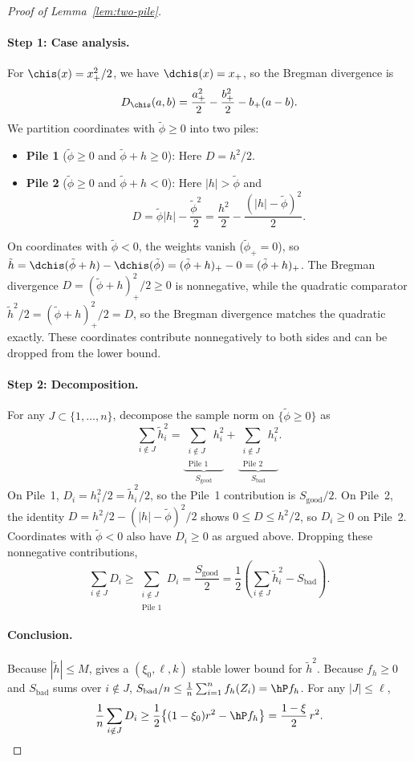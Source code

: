 \documentclass{article}
\begin{document}
\begin{proof}[Proof of Lemma~\ref{lem:two-pile}]
\paragraph{Step 1: Case analysis.}
For $\chis(x) = x_+^2/2$, we have $\dchis(x) = x_+$, so the Bregman divergence is
\[
D_{\chis}(a, b) = \frac{a_+^2}{2} - \frac{b_+^2}{2} - b_+(a - b).
\]
We partition coordinates with $\tilde\phi \ge 0$ into two piles:
\begin{itemize}
\item \textbf{Pile 1} ($\tilde\phi \ge 0$ and $\tilde\phi + h \ge 0$): Here $D = h^2/2$.
\item \textbf{Pile 2} ($\tilde\phi \ge 0$ and $\tilde\phi + h < 0$): Here $|h| > \tilde\phi$ and
\[
D = \tilde\phi|h| - \frac{\tilde\phi^2}{2} = \frac{h^2}{2} - \frac{(|h| - \tilde\phi)^2}{2}.
\]
\end{itemize}
On coordinates with $\tilde\phi < 0$,
the weights vanish ($\tilde\phi_+ = 0$),
so $\tilde h = \dchis(\tilde\phi + h) - \dchis(\tilde\phi) = (\tilde\phi + h)_+ - 0 = (\tilde\phi + h)_+$.
The Bregman divergence
$D = (\tilde\phi + h)_+^2/2 \ge 0$
is nonnegative,
while the quadratic comparator $\tilde h^2/2 = (\tilde\phi + h)_+^2/2 = D$,
so the Bregman divergence matches the quadratic exactly.
These coordinates contribute nonnegatively to both sides
and can be dropped from the lower bound.

\paragraph{Step 2: Decomposition.}
For any $J \subset \{1,\ldots,n\}$, decompose the sample norm on $\{\tilde\phi \ge 0\}$ as
\[
\sum_{i \notin J} \tilde h_i^2 = \underbrace{\sum_{\substack{i \notin J \\ \text{Pile 1}}} h_i^2}_{S_{\mathrm{good}}} + \underbrace{\sum_{\substack{i \notin J \\ \text{Pile 2}}} h_i^2}_{S_{\mathrm{bad}}}.
\]
On Pile~1, $D_i = h_i^2/2 = \tilde h_i^2/2$,
so the Pile~1 contribution is $S_{\mathrm{good}}/2$.
On Pile~2, the identity
$D = h^2/2 - (|h| - \tilde\phi)^2/2$
shows $0 \le D \le h^2/2$,
so $D_i \ge 0$ on Pile~2.
Coordinates with $\tilde\phi < 0$ also have $D_i \ge 0$
as argued above.
Dropping these nonnegative contributions,
\[
\sum_{i \notin J} D_i
  \ge \sum_{\substack{i \notin J \\ \text{Pile 1}}} D_i
  = \frac{S_{\mathrm{good}}}{2}
  = \frac{1}{2}\left(\sum_{i \notin J} \tilde h_i^2 - S_{\mathrm{bad}}\right).
\]

\paragraph{Conclusion.}
Because $|\tilde h| \le M$,
 gives
a $(\xi_0, \ell, k)$ stable lower bound for $\tilde h^2$.
Because $f_h \ge 0$
and $S_{\mathrm{bad}}$ sums over $i \notin J$,
$S_{\mathrm{bad}}/n
  \le \frac{1}{n}\sum_{i=1}^n f_h(Z_i)
  = \hP f_h$.
For any $|J| \le \ell$,
\[
\frac{1}{n}\sum_{i \notin J} D_i
  \ge \frac{1}{2}\qty{(1-\xi_0) r^2
    - \hP f_h}
  = \frac{1-\xi}{2}\, r^2. \qedhere
\]
\end{proof}
\end{document}
